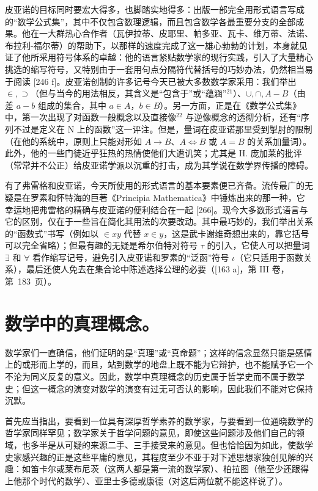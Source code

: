 皮亚诺的目标同时要宏大得多，也脚踏实地得多：出版一部完全用形式语言写成的“数学公式集”，其中不仅包含数理逻辑，而且包含数学各最重要分支的全部成果。他在一大群热心合作者（瓦伊拉蒂、皮耶里、帕多亚、瓦卡、维万蒂、法诺、布拉利-福尔蒂）的帮助下，以那样的速度完成了这一雄心勃勃的计划，本身就见证了他所采用符号体系的卓越：他的语言紧贴数学家的现行实践，引入了大量精心挑选的缩写符号，又特别由于一套用句点分隔符代替括号的巧妙办法，仍然相当易于阅读 {[}246 f{]}。皮亚诺创制的许多记号今天已被大多数数学家采用：我们举出 \(\in, \supset\)（但与当今的用法相反，其含义是“包含于”或“蕴涵”\(^{21}\)）、\(\cup, \cap, A - B\)（由差 \(a - b\) 组成的集合，其中 \(a \in A\)，\(b \in B\)）。另一方面，正是在《数学公式集》中，第一次出现了对函数一般概念以及直接像\(^{22}\) 与逆像概念的透彻分析，还有“序列不过是定义在 N 上的函数”这一评注。但是，量词在皮亚诺那里受到掣肘的限制（在他的系统中，原则上只能对形如 \(A \to B\)、\(A \Leftrightarrow B\) 或 \(A = B\) 的关系加量词）。此外，他的一些门徒近乎狂热的热情使他们大遭讥笑；尤其是 H. 庞加莱的批评（常常并不公正）给皮亚诺学派以沉重的打击，成为其学说在数学界传播的障碍。

有了弗雷格和皮亚诺，今天所使用的形式语言的基本要素便已齐备。流传最广的无疑是在罗素和怀特海的巨著《Principia Mathematica》中锤炼出来的那一种，它幸运地把弗雷格的精确与皮亚诺的便利结合在一起 {[}266{]}。现今大多数形式语言与它的区别，仅在于一些旨在简化其用法的次要改动。其中最巧妙的，我们举出关系的“函数式”书写（例如以 \(\in xy\) 代替 \(x \in y\)，这是武卡谢维奇想出来的，靠它括号可以完全省略）；但最有趣的无疑是希尔伯特对符号 \(\tau\) 的引入，它使人可以把量词 \(\exists\) 和 \(\forall\) 看作缩写记号，避免引入皮亚诺和罗素的“泛函”符号 \(\iota\)（它只适用于函数关系），最后还使人免去在集合论中陈述选择公理的必要（{[}163 a{]}，第 III 卷，第~183~页）。

\section*{数学中的真理概念。}
{}

数学家们一直确信，他们证明的是“真理”或“真命题”；这样的信念显然只能是感情上的或形而上学的，而且，站到数学的地盘上既不能为它辩护，也不能赋予它一个不沦为同义反复的意义。因此，数学中真理概念的历史属于哲学史而不属于数学史；但这一概念的演变对数学的演变有过无可否认的影响，因此我们不能对它保持沉默。

首先应当指出，要看到一位具有深厚哲学素养的数学家，与要看到一位通晓数学的哲学家同样罕见；数学家关于哲学问题的意见，即使这些问题涉及他们自己的领域，也多半是从可疑的来源二手、三手接受来的意见。但也恰恰因为如此，使数学史家感兴趣的正是这些平庸的意见，其程度至少不亚于对下述思想家独创见解的兴趣：如笛卡尔或莱布尼茨（这两人都是第一流的数学家）、柏拉图（他至少还跟得上他那个时代的数学）、亚里士多德或康德（对这后两位就不能这样说了）。

